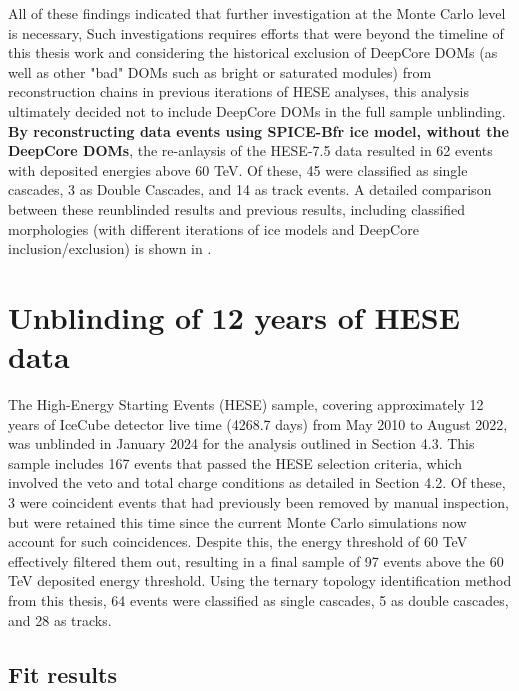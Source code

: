 All of these findings indicated that further investigation at the Monte Carlo level is necessary,  Such investigations requires efforts that were beyond the timeline of this thesis work and  considering the historical exclusion of DeepCore DOMs (as well as other "bad" DOMs such as bright or saturated modules) from reconstruction chains in previous iterations of HESE analyses, this analysis ultimately decided not to include DeepCore DOMs in the full sample unblinding. \textbf{By reconstructing data events using SPICE-Bfr ice model, without the DeepCore DOMs}, the re-anlaysis of the HESE-7.5 data resulted in 62 events with deposited energies above 60 TeV. Of these, 45 were classified as single cascades, 3 as Double Cascades, and 14 as track events. A detailed comparison between these  reunblinded results and previous results, including classified morphologies (with different iterations of ice models and DeepCore inclusion/exclusion) is shown in .

\section{Unblinding of 12 years of HESE data}
\label{sec:HESE12}
The High-Energy Starting Events (HESE) sample, covering approximately 12 years of IceCube detector live time (4268.7 days) from May 2010 to August 2022, was unblinded in January 2024 for the analysis outlined in Section 4.3. This sample includes 167 events that passed the HESE selection criteria, which involved the veto and total charge conditions as detailed in Section 4.2. Of these, 3 were coincident events that had previously been removed by manual inspection, but were retained this time since the current Monte Carlo simulations now account for such coincidences. Despite this, the energy threshold of 60 TeV effectively filtered them out, resulting in a final sample of 97 events above the 60 TeV deposited energy threshold. Using the ternary topology identification method from this thesis, 64 events were classified as single cascades, 5 as double cascades, and 28 as tracks.

\subsection{Fit results}
\label{sec:HESE12_fitresults}

